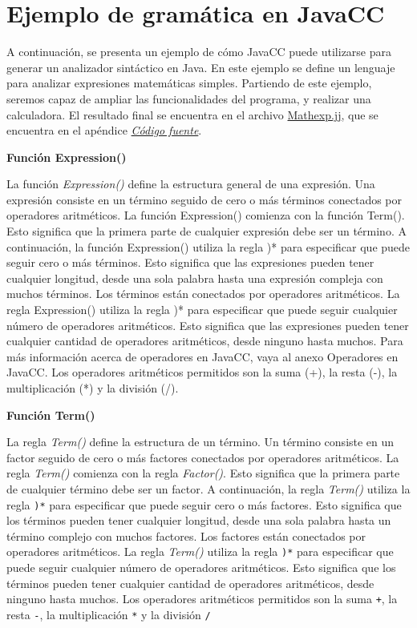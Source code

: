 \section{Ejemplo de gramática en JavaCC}
A continuación, se presenta un ejemplo de cómo JavaCC puede utilizarse para generar un analizador sintáctico en Java. En este ejemplo se define un lenguaje para analizar expresiones matemáticas simples. Partiendo de este ejemplo, seremos capaz de ampliar las funcionalidades del programa, y realizar una calculadora. El resultado final se encuentra en el archivo \hyperref[sec:mathexp]{Mathexp.jj}, que se encuentra en el apéndice \hyperref[sec:codigofuente]{\textit{Código fuente}}.


\textbf{Función Expression()}

\lstset{inputencoding=utf8/latin1}


La función \textit{Expression()} define la estructura general de una expresión. Una expresión consiste en un término seguido de cero o más términos conectados por operadores aritméticos. La función Expression() comienza con la función Term(). Esto significa que la primera parte de cualquier expresión debe ser un término. A continuación, la función Expression() utiliza la regla )* para especificar que puede seguir cero o más términos. Esto significa que las expresiones pueden tener cualquier longitud, desde una sola palabra hasta una expresión compleja con muchos términos.
Los términos están conectados por operadores aritméticos. La regla Expression() utiliza la regla )* para especificar que puede seguir cualquier número de operadores aritméticos. Esto significa que las expresiones pueden tener cualquier cantidad de operadores aritméticos, desde ninguno hasta muchos. Para más información acerca de operadores en JavaCC, vaya al anexo Operadores en JavaCC.
Los operadores aritméticos permitidos son la suma (+), la resta (-), la multiplicación (*) y la división (/).

\textbf{Función Term()}
\lstset{inputencoding=utf8/latin1}


La regla \textit{Term()} define la estructura de un término. Un término consiste en un factor seguido de cero o más factores conectados por operadores aritméticos. La regla \textit{Term()} comienza con la regla \textit{Factor()}. Esto significa que la primera parte de cualquier término debe ser un factor. A continuación, la regla \textit{Term()} utiliza la regla \lstinline|)*| para especificar que puede seguir cero o más factores. Esto significa que los términos pueden tener cualquier longitud, desde una sola palabra hasta un término complejo con muchos factores.
Los factores están conectados por operadores aritméticos. La regla \textit{Term()} utiliza la regla \lstinline|)*| para especificar que puede seguir cualquier número de operadores aritméticos. Esto significa que los términos pueden tener cualquier cantidad de operadores aritméticos, desde ninguno hasta muchos.
Los operadores aritméticos permitidos son la suma \lstinline|+|, la resta \lstinline|-|, la multiplicación \lstinline|*| y la división \lstinline|/|

